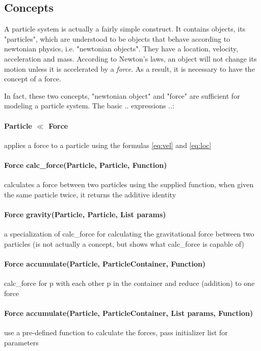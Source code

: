 \documentclass[runningheads,a4paper]{llncs}
\begin{document}
\subsection{Concepts}
A particle system is actually a fairly simple construct. It contains objects, its "particles", which are understood to be objects that behave according to newtonian physics, i.e. "newtonian objects". They have a location, velocity, acceleration and mass. According to Newton's laws, an object will not change its motion unless it is accelerated by a \emph{force}. As a result, it is necessary to have the concept of a force.

In fact, these two concepts, "newtonian object" and "force" are sufficient for modeling a particle system. The basic .. expressions ..:

\paragraph{Particle $\ll$ Force}
applies a force to a particle using the formulas \ref{eq:vel} and \ref{eq:loc}

\paragraph{Force calc\_force(Particle, Particle, Function)}
calculates a force between two particles using the supplied function, when given the same particle twice, it returns the additive identity

\paragraph{Force gravity(Particle, Particle, List params)}
a specialization of calc\_force for calculating the gravitational force between two particles (is not actually a concept, but shows what calc\_force is capable of)

\paragraph{Force accumulate(Particle, ParticleContainer, Function)}
calc\_force for p with each other p in the container and reduce (addition) to one force

\paragraph{Force accumulate(Particle, ParticleContainer, List params, Function)}
use a pre-defined function to calculate the forces, pass initializer list for parameters
\end{document}
